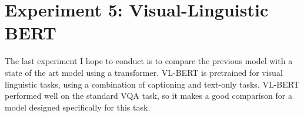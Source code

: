 
\section{Experiment 5: Visual-Linguistic BERT}
The last experiment I hope to conduct is to compare the previous model with a state of the art model using a transformer. VL-BERT is pretrained for visual linguistic tasks, using a combination of captioning and text-only tasks\cite{VLBERT}. VL-BERT performed well on the standard VQA task, so it makes a good comparison for a model designed specifically for this task. 








